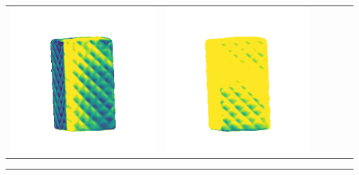 \begin{tabularx}{\linewidth}{@{}Y@{}Y@{}Y@{}Y@{}Y@{}Y@{}}
\includegraphics[width=\linewidth]{semisynthetic/20150514_18_marrnet_err.png} &
\includegraphics[width=\linewidth]{semisynthetic/20150514_18_ef_err.png} \\
\end{tabularx}
\begin{center}\rule{0.5\linewidth}{\linethickness}\end{center}

